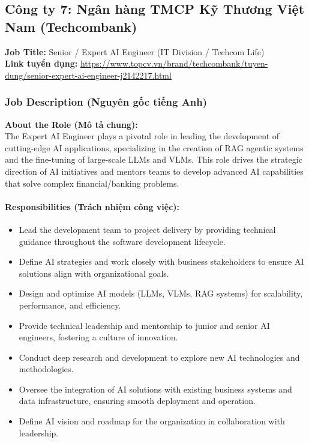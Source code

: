 \subsection{Công ty 7: Ngân hàng TMCP Kỹ Thương Việt Nam (Techcombank)}

\noindent\textbf{Job Title:} Senior / Expert AI Engineer (IT Division / Techcom Life) \\
\textbf{Link tuyển dụng:} \url{https://www.topcv.vn/brand/techcombank/tuyen-dung/senior-expert-ai-engineer-j2142217.html}

\subsubsection*{Job Description (Nguyên gốc tiếng Anh)}

\textbf{About the Role (Mô tả chung):} \\
\indent The Expert AI Engineer plays a pivotal role in leading the development of cutting-edge AI applications, specializing in the creation of RAG agentic systems and the fine-tuning of large-scale LLMs and VLMs. This role drives the strategic direction of AI initiatives and mentors teams to develop advanced AI capabilities that solve complex financial/banking problems.

\paragraph{Responsibilities (Trách nhiệm công việc):}
\begin{itemize}
    \item Lead the development team to project delivery by providing technical guidance throughout the software development lifecycle.
    \item Define AI strategies and work closely with business stakeholders to ensure AI solutions align with organizational goals.
    \item Design and optimize AI models (LLMs, VLMs, RAG systems) for scalability, performance, and efficiency.
    \item Provide technical leadership and mentorship to junior and senior AI engineers, fostering a culture of innovation.
    \item Conduct deep research and development to explore new AI technologies and methodologies.
    \item Oversee the integration of AI solutions with existing business systems and data infrastructure, ensuring smooth deployment and operation.
    \item Define AI vision and roadmap for the organization in collaboration with leadership.
\end{itemize}

